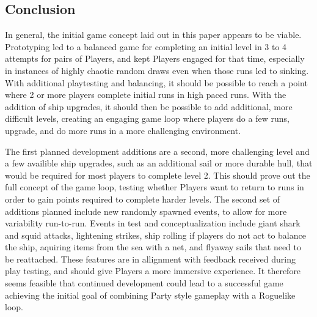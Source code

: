 \subsection{Conclusion}\label{sec:conclusion}
In general, the initial game concept laid out in this paper appears to be
viable. Prototyping led to a balanced game for completing an initial level
in 3 to 4 attempts for pairs of Players, and kept Players engaged for that
time, especially in instances of highly chaotic random draws even when those
runs led to sinking. With additional playtesting and balancing, it should be
possible to reach a point where 2 or more players complete initial runs in
high paced runs. With the addition of ship upgrades, it should then be possible
to add additional, more difficult levels, creating an engaging game loop where
players do a few runs, upgrade, and do more runs in a more challenging 
environment.

The first planned development additions are a second, more challenging level
and a few availible ship upgrades, such as an additional sail or more durable
hull, that would be required for most players to complete level 2. This should
prove out the full concept of the game loop, testing whether Players want to
return to runs in order to gain points required to complete harder levels. The
second set of additions planned include new randomly spawned events, to allow
for more variability run-to-run. Events in test and conceptualization include
giant shark and squid attacks, lightening strikes, ship rolling if players do
not act to balance the ship, aquiring items from the sea with a net, and
flyaway sails that need to be reattached. These features are in allignment
with feedback received during play testing, and should give Players a more
immersive experience. It therefore seems feasible that continued development
could lead to a successful game achieving the initial goal of combining Party
style gameplay with a Roguelike loop.
